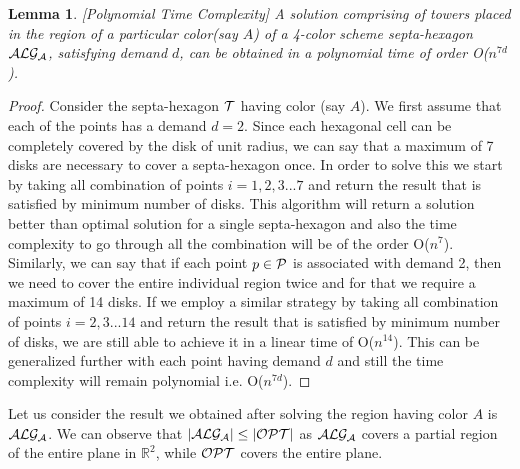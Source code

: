 \documentclass[a4paper,10pt]{article}  %
\newtheorem{lemma}{Lemma}
\begin{document}
	
	\begin{lemma}\label{poly}[Polynomial Time Complexity]
		A solution comprising of towers placed in the region of a particular color(say $A$) of a 4-color scheme septa-hexagon ${\cal ALG_A}$, satisfying demand $d$, can be obtained in a polynomial time of order O($n^{7d}$).
	\end{lemma}
	\begin{proof}
		Consider the septa-hexagon ${\cal T}$ having color (say $A$). We first assume that each of the points has a demand $d=2$. Since each hexagonal cell can be completely covered by the disk of unit radius, we can say that a maximum of 7 disks are necessary to cover a septa-hexagon once. In order to solve this we start by taking all combination of points $i=1,2,3...7$ and return the result that is satisfied by minimum number of disks. This algorithm will return a solution better than optimal solution for a single septa-hexagon and also the time complexity to go through all the combination will be of the order O($n^7$). Similarly, we can say that if each point $p \in {\cal P}$ is associated with demand 2, then we need to cover the entire individual region twice and for that we require a maximum of 14 disks. If we employ a similar strategy  by taking all combination of points $i = 2,3...14$ and return the result that is satisfied by minimum number of disks, we are still able to achieve it in a linear time of O($n^{14}$). This can be generalized further with each point having demand $d$ and still the time complexity will remain polynomial i.e. O($n^{7d}$).
	\end{proof}
	
	Let us consider the result we obtained after solving the region having color $A$ is ${\cal ALG_A}$.  We can observe that $|{\cal ALG_A}|\leq |{\cal OPT}|$ as ${\cal ALG_A}$ covers a partial region of the entire plane in $\mathbb{R}^2$, while ${\cal OPT}$ covers the entire plane.
	
\end{document}
